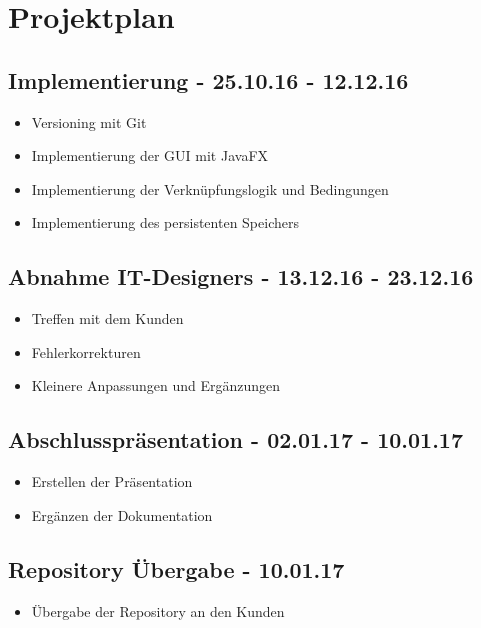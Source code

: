 
\section{Projektplan}
\subsection{Implementierung - 25.10.16 - 12.12.16}
\begin{itemize}
\item Versioning mit Git
\item Implementierung der GUI mit JavaFX
\item Implementierung der Verknüpfungslogik und Bedingungen
\item Implementierung des persistenten Speichers
\end{itemize}

\subsection{Abnahme IT-Designers - 13.12.16 - 23.12.16}
\begin{itemize}
\item Treffen mit dem Kunden
\item Fehlerkorrekturen
\item Kleinere Anpassungen und Ergänzungen
\end{itemize}

\subsection{Abschlusspräsentation - 02.01.17 - 10.01.17}
\begin{itemize}
\item Erstellen der Präsentation
\item Ergänzen der Dokumentation
\end{itemize}

\subsection{Repository Übergabe - 10.01.17}
\begin{itemize}
\item Übergabe der Repository an den Kunden
\end{itemize}